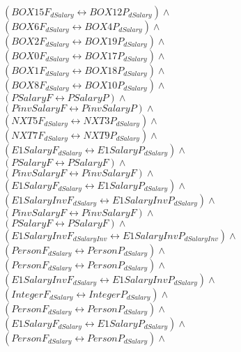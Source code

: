 \documentclass[a4paper,10pt]{article}
\begin{document}
 $ (BOX15F_{dSalary} \leftrightarrow BOX12P_{dSalary}) \land $ \\ 
 $ (BOX6F_{dSalary} \leftrightarrow BOX4P_{dSalary}) \land $ \\ 
 $ (BOX2F_{dSalary} \leftrightarrow BOX19P_{dSalary}) \land $ \\ 
 $ (BOX0F_{dSalary} \leftrightarrow BOX17P_{dSalary}) \land $ \\ 
 $ (BOX1F_{dSalary} \leftrightarrow BOX18P_{dSalary}) \land $ \\ 
 $ (BOX8F_{dSalary} \leftrightarrow BOX10P_{dSalary}) \land $ \\ 
 $ (PSalaryF \leftrightarrow PSalaryP) \land $ \\ 
 $ (PinvSalaryF \leftrightarrow PinvSalaryP) \land $ \\ 
 $ (NXT5F_{dSalary} \leftrightarrow NXT3P_{dSalary}) \land $ \\ 
 $ (NXT7F_{dSalary} \leftrightarrow NXT9P_{dSalary}) \land $ \\ 
 $ (E1SalaryF_{dSalary} \leftrightarrow E1SalaryP_{dSalary}) \land $ \\ 
 $ (PSalaryF \leftrightarrow PSalaryF) \land $ \\ 
 $ (PinvSalaryF \leftrightarrow PinvSalaryF) \land $ \\ 
 $ (E1SalaryF_{dSalary} \leftrightarrow E1SalaryP_{dSalary}) \land $ \\ 
 $ (E1SalaryInvF_{dSalary} \leftrightarrow E1SalaryInvP_{dSalary}) \land $ \\ 
 $ (PinvSalaryF \leftrightarrow PinvSalaryF) \land $ \\ 
 $ (PSalaryF \leftrightarrow PSalaryF) \land $ \\ 
 $ (E1SalaryInvF_{dSalaryInv} \leftrightarrow E1SalaryInvP_{dSalaryInv}) \land $ \\ 
 $ (PersonF_{dSalary} \leftrightarrow PersonP_{dSalary}) \land $ \\ 
 $ (PersonF_{dSalary} \leftrightarrow PersonP_{dSalary}) \land $ \\ 
 $ (E1SalaryInvF_{dSalary} \leftrightarrow E1SalaryInvP_{dSalary}) \land $ \\ 
 $ (IntegerF_{dSalary} \leftrightarrow IntegerP_{dSalary}) \land $ \\ 
 $ (PersonF_{dSalary} \leftrightarrow PersonP_{dSalary}) \land $ \\ 
 $ (E1SalaryF_{dSalary} \leftrightarrow E1SalaryP_{dSalary}) \land $ \\ 
 $ (PersonF_{dSalary} \leftrightarrow PersonP_{dSalary}) \land $ \\ 
\end{document}
